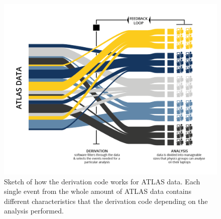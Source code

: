 \begin{figure}[t]
\centering
\includegraphics[width=.55\textwidth]{MCSample/Derivation}
\caption{Sketch of how the derivation code works for ATLAS data. Each single event from the whole amount of ATLAS data contains different characteristics that the derivation code depending on the analysis performed.}
\label{fig:derivation}
\end{figure}















